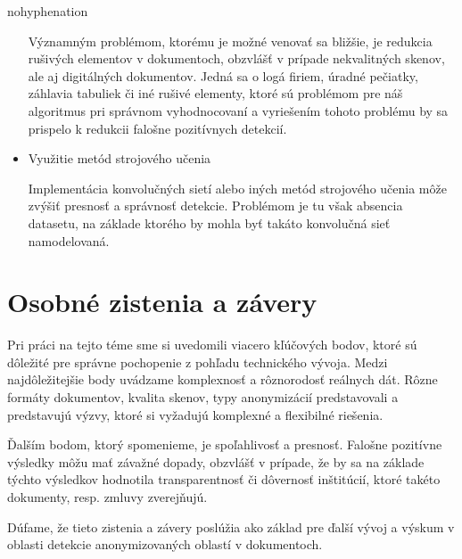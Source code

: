 \begin{hyphenrules}{nohyphenation}
\begin{itemize}
    Významným problémom, ktorému je možné venovať sa bližšie, je redukcia rušivých elementov v dokumentoch, obzvlášť v prípade nekvalitných skenov, ale aj digitálných dokumentov. Jedná sa o logá firiem, úradné pečiatky, záhlavia tabuliek či iné rušivé elementy, ktoré sú problémom pre náš algoritmus pri správnom vyhodnocovaní a vyriešením tohoto problému by sa prispelo k redukcii falošne pozitívnych detekcií.

    \item Využitie metód strojového učenia

    Implementácia konvolučných sietí alebo iných metód strojového učenia môže zvýšiť presnosť a správnosť detekcie. Problémom je tu však absencia datasetu, na základe ktorého by mohla byť takáto konvolučná sieť namodelovaná.

\end{itemize}

\section{Osobné zistenia a závery}
Pri práci na tejto téme sme si uvedomili viacero kľúčových bodov, ktoré sú dôležité pre správne pochopenie z pohľadu technického vývoja. Medzi najdôležitejšie body uvádzame komplexnosť a rôznorodosť reálnych dát. Rôzne formáty dokumentov, kvalita skenov, typy anonymizácií predstavovali a predstavujú výzvy, ktoré si vyžadujú komplexné a flexibilné riešenia. 
\newline

Ďalším bodom, ktorý spomenieme, je spoľahlivosť a presnosť. Falošne pozitívne výsledky môžu mať závažné dopady, obzvlášť v prípade, že by sa na základe týchto výsledkov hodnotila transparentnosť či dôvernosť inštitúcií, ktoré takéto dokumenty, resp. zmluvy zverejňujú.
\newline

Dúfame, že tieto zistenia a závery poslúžia ako základ pre ďalší vývoj a výskum v oblasti detekcie anonymizovaných oblastí v dokumentoch.
\end{hyphenrules}